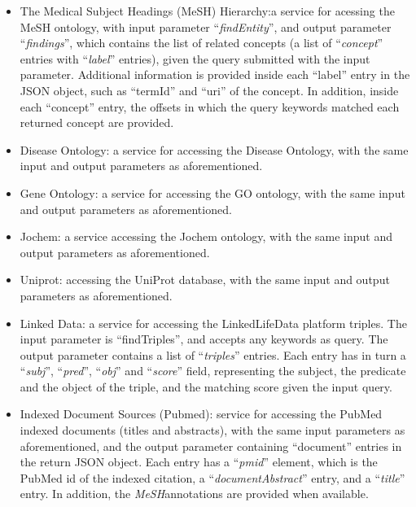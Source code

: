 \begin{itemize}
\item The Medical Subject Headings (MeSH) Hierarchy:a service for acessing the MeSH ontology, with input parameter ``\emph{findEntity}'', and output parameter ``\emph{findings}'', which contains the list of related concepts (a list of ``\emph{concept}'' entries with ``\emph{label}'' entries), given the query submitted with the input parameter. Additional information is provided inside each ``label'' entry in the JSON object, such as ``termId'' and ``uri'' of the concept. In addition, inside each ``concept'' entry, the offsets in which the query keywords matched each returned concept are provided.
\item Disease Ontology: a service for accessing the Disease Ontology, with the same input and output parameters as aforementioned.
\item Gene Ontology: a service for accessing the GO ontology, with the same input and output parameters as aforementioned.
\item Jochem: a service accessing the Jochem ontology, with the same input and output parameters as aforementioned.
\item Uniprot: accessing the UniProt database, with the same input and output parameters as aforementioned.
\item Linked Data: a service for accessing the LinkedLifeData platform triples. The input parameter is ``findTriples'', and accepts any keywords as query. The output parameter contains a list of ``\emph{triples}'' entries. Each entry has in turn a ``\emph{subj}'', ``\emph{pred}'', ``\emph{obj}'' and ``\emph{score}'' field, representing the subject, the predicate and the object of the triple, and the matching score given the input query.
\item Indexed Document Sources (Pubmed):  service for accessing the PubMed indexed documents (titles and abstracts), with the same input parameters as aforementioned, and the output parameter containing ``document'' entries in the return JSON object. Each entry has a ``\emph{pmid}'' element, which is the PubMed id of the indexed citation, a ``\emph{documentAbstract}'' entry, and a ``\emph{title}'' entry. In addition, the \emph{MeSH}annotations are provided when available.
\begin{comment}
\item Full Document Sources: a service for accessing the \emph{PMC} full text articles, with the same input parameters and output parameters as aforementioned, with the only difference being that the articles returned contain in addtion the full text.
\end{comment}
\end{itemize}
